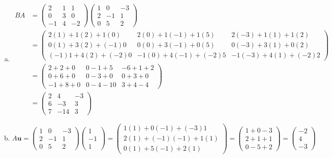 \documentclass[11pt,letterpaper]{article}
\begin{document}
\begin{enumerate}[(a)]
\item 
	\[
	\begin{aligned}
	BA&= \begin{pmatrix} 2 & 1 & 1 \\ 0 & 3 & 0 \\ -1 & 4 & -2 \end{pmatrix} \begin{pmatrix} 1 & 0 & -3 \\ 2 & -1 & 1 \\ 0 & 5 & 2 \end{pmatrix} \\[0.3cm]
	&= \begin{pmatrix} 2(1) + 1(2) + 1(0) & 2(0) + 1(-1) + 1(5) & 2(-3) + 1(1) + 1(2) \\ 0(1) + 3(2) + (-1)0 & 0(0) + 3(-1) + 0(5) & 0(-3) + 3(1) + 0(2) \\ (-1)1 + 4(2) + (-2)0 & -1(0) + 4(-1) + (-2)5 & -1(-3) + 4(1) + (-2)2 \end{pmatrix} \\[0.3cm]
	&= \begin{pmatrix} 2 + 2 + 0 & 0 - 1 + 5 & -6 + 1 + 2 \\ 0 + 6 + 0 & 0 - 3 + 0 & 0 + 3 + 0 \\ -1 + 8 + 0 & 0 - 4 - 10 & 3 + 4 - 4 \end{pmatrix} \\[0.3cm]
	&= \begin{pmatrix} 2 & 4 & -3 \\ 6 & -3 & 3 \\ 7 & -14 & 3 \end{pmatrix}
	\end{aligned}
	\] \pspace

\item 
	\[
	A\mathbf{u}= \begin{pmatrix} 1 & 0 & -3 \\ 2 & -1 & 1 \\ 0 & 5 & 2 \end{pmatrix} \begin{pmatrix} 1 \\ -1 \\ 1 \end{pmatrix}= \begin{pmatrix} 1(1) + 0(-1) + (-3)1 \\ 2(1) + (-1)(-1) + 1(1) \\ 0(1) + 5(-1) + 2(1) \end{pmatrix}= \begin{pmatrix} 1 + 0 - 3 \\ 2 + 1 + 1 \\ 0 - 5 + 2 \end{pmatrix}= \begin{pmatrix} -2 \\ 4 \\ -3 \end{pmatrix}
	\]
\end{enumerate}
\end{document}

